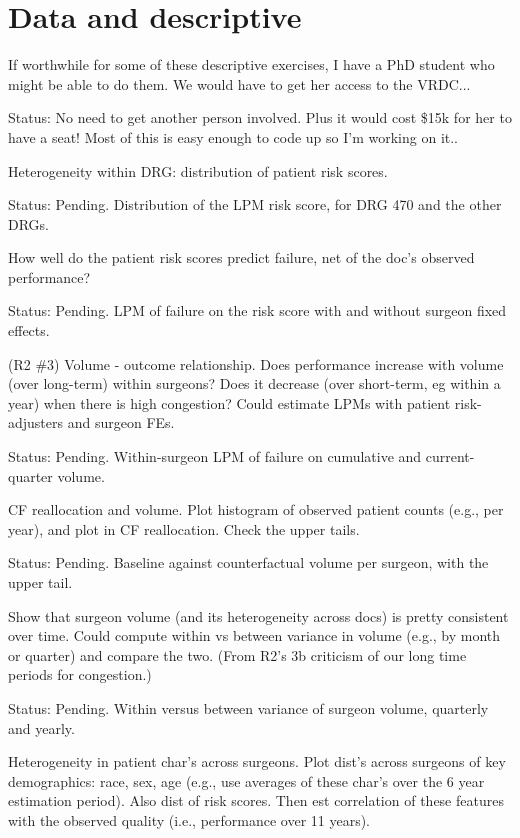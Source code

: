\documentclass[11pt]{article}
\newcommand{\status}[1]{\par\noindent Status: #1\par\medskip\noindent{\color{gray!40}\hrulefill}\par\medskip}
\begin{document}
\section{Data and descriptive}

If worthwhile for some of these descriptive exercises, I have a PhD student who might be able to do them. We would have to get her access to the VRDC...

\status{No need to get another person involved. Plus it would cost \$15k for her to have a seat! Most of this is easy enough to code up so I'm working on it..}

Heterogeneity within DRG: distribution of patient risk scores.

\status{Pending. Distribution of the LPM risk score, for DRG 470 and the other DRGs.}

How well do the patient risk scores predict failure, net of the doc's observed performance?

\status{Pending. LPM of failure on the risk score with and without surgeon fixed effects.}

(R2 \#3) Volume - outcome relationship. Does performance increase with volume (over long-term) within surgeons? Does it decrease (over short-term, eg within a year) when there is high congestion? Could estimate LPMs with patient risk-adjusters and surgeon FEs.

\status{Pending. Within-surgeon LPM of failure on cumulative and current-quarter volume.}

CF reallocation and volume. Plot histogram of observed patient counts (e.g., per year), and plot in CF reallocation. Check the upper tails.

\status{Pending. Baseline against counterfactual volume per surgeon, with the upper tail.}

Show that surgeon volume (and its heterogeneity across docs) is pretty consistent over time. Could compute within vs between variance in volume (e.g., by month or quarter) and compare the two. (From R2's 3b criticism of our long time periods for congestion.)

\status{Pending. Within versus between variance of surgeon volume, quarterly and yearly.}

Heterogeneity in patient char's across surgeons. Plot dist's across surgeons of key demographics: race, sex, age (e.g., use averages of these char's over the 6 year estimation period). Also dist of risk scores. Then est correlation of these features with the observed quality (i.e., performance over 11 years).
\end{document}
